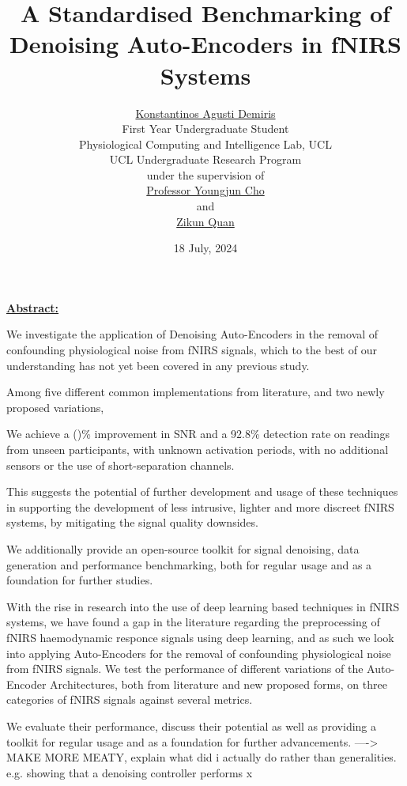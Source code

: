\documentclass[9pt]{article}
\title{A Standardised Benchmarking of Denoising Auto-Encoders in fNIRS Systems}
\author{ \large{ \ul{Konstantinos Agusti Demiris} }\vspace{0mm}\\\small {First Year Undergraduate Student} \\ \small {Physiological Computing and Intelligence Lab, UCL}\\ \small{UCL Undergraduate Research Program} \\\vspace{1mm} \footnotesize under the supervision of \\ \vspace{2mm} {\small \ul{Professor Youngjun Cho}} \vspace{-1mm}\\\footnotesize{and}\\ \vspace{-2mm} {\small \ul{Zikun Quan}} \vspace{5mm}}
\date{18 July, 2024}
\begin{document}
\maketitle
\pagebreak
\vspace{-4mm}
\underline{\textbf{Abstract:}}
\vspace{-2mm}

We investigate the application of Denoising Auto-Encoders in the removal of confounding physiological noise from fNIRS signals, which to the best of our understanding has not yet been covered in any previous study. 

Among five different common implementations from literature, and two newly proposed variations,

We achieve a ()\% improvement in SNR and a 92.8\% detection rate on readings  from unseen participants, with unknown activation periods, with no additional sensors or the use of short-separation channels.

This suggests the potential of further development and usage of these techniques in supporting the development of less intrusive, lighter and more discreet fNIRS systems, by mitigating the signal quality downsides.

We additionally provide an open-source toolkit for signal denoising, data generation and performance benchmarking, both for regular usage and as a foundation for further studies.

With the rise in research into the use of deep learning based techniques in fNIRS systems, we have found a gap in the literature regarding the preprocessing of fNIRS haemodynamic responce signals using deep learning, and as such we look into applying Auto-Encoders for the removal of confounding physiological noise from fNIRS signals. We test the performance of different variations of the Auto-Encoder Architectures, both from literature and new proposed forms, on three categories of fNIRS signals against several metrics. 

We evaluate their performance, discuss their potential as well as providing a toolkit for regular usage and as a foundation for further advancements. ----> MAKE MORE MEATY, explain what did i actually do rather than generalities. e.g. showing that a denoising controller performs x%
\end{document}
